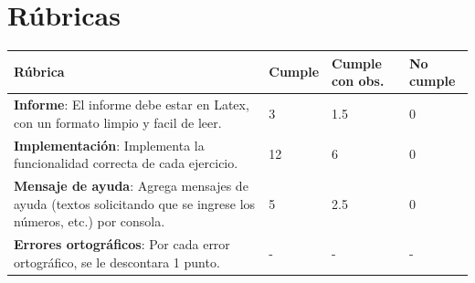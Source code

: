 \documentclass{article}
\begin{document}
	
\clearpage
	\section{Rúbricas}
	
	\begin{table}[hbt!]
		\setlength{\tabcolsep}{0.5em} %
		{\renewcommand{\arraystretch}{1.5}%
		\begin{tabular}{|p{5cm}|x{3cm}|x{3cm}|x{3cm}|}
			\hline 
			\textbf{Rúbrica} & \textbf{Cumple}  & \textbf{Cumple con obs.}  & \textbf{No cumple} \\
			\hline 
			\textbf{Informe}: El informe debe estar en Latex, con un formato limpio y facil de leer.  & 3 & 1.5 & 0   \\ 
			\hline 
			\textbf{Implementación}: Implementa la funcionalidad correcta de cada ejercicio.  & 12 & 6 & 0   \\ \hline
			\textbf{Mensaje de ayuda}: Agrega mensajes de ayuda (textos solicitando que se ingrese los números, etc.) por consola.  & 5 & 2.5 & 0   \\ \hline
			
							
			
			\textbf{Errores ortográficos}: Por cada error ortográfico, se le descontara 1 punto.  & - & - & -   \\ \hline
			
		\end{tabular}
	}
	\end{table}
	
	
	
	
	
	
	
\end{document}
